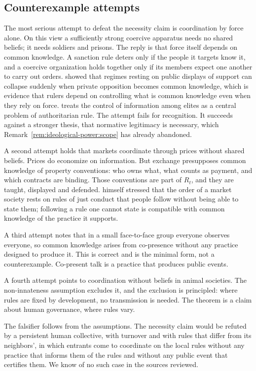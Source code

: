 \documentclass[11pt,letterpaper]{article}
\theoremstyle{definition}
\theoremstyle{remark}
\begin{document}
\subsection{Counterexample attempts}

The most serious attempt to defeat the necessity claim is coordination by force alone. On this view a sufficiently strong coercive apparatus needs no shared beliefs; it needs soldiers and prisons. The reply is that force itself depends on common knowledge. A sanction rule deters only if the people it targets know it, and a coercive organization holds together only if its members expect one another to carry out orders. \citet{kuran1991} showed that regimes resting on public displays of support can collapse suddenly when private opposition becomes common knowledge, which is evidence that rulers depend on controlling what is common knowledge even when they rely on force. \citet{svolik2012} treats the control of information among elites as a central problem of authoritarian rule. The attempt fails for recognition. It succeeds against a stronger thesis, that normative legitimacy is necessary, which Remark~\ref{rem:ideological-power:scope} has already abandoned.

A second attempt holds that markets coordinate through prices without shared beliefs. Prices do economize on information. But exchange presupposes common knowledge of property conventions: who owns what, what counts as payment, and which contracts are binding. Those conventions are part of $R_t$, and they are taught, displayed and defended. \citet{hayek1973} himself stressed that the order of a market society rests on rules of just conduct that people follow without being able to state them; following a rule one cannot state is compatible with common knowledge of the practice it supports.

A third attempt notes that in a small face-to-face group everyone observes everyone, so common knowledge arises from co-presence without any practice designed to produce it. This is correct and is the minimal form, not a counterexample. Co-present talk is a practice that produces public events.

A fourth attempt points to coordination without beliefs in animal societies. The non-innateness assumption excludes it, and the exclusion is principled: where rules are fixed by development, no transmission is needed. The theorem is a claim about human governance, where rules vary.

The falsifier follows from the assumptions. The necessity claim would be refuted by a persistent human collective, with turnover and with rules that differ from its neighbors', in which entrants come to coordinate on the local rules without any practice that informs them of the rules and without any public event that certifies them. We know of no such case in the sources reviewed.
\end{document}
